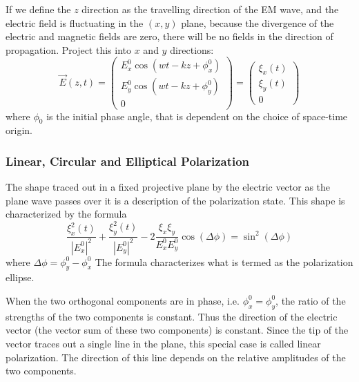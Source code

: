 If we define the $z$ direction as the travelling direction of the EM wave,
	and the electric field is fluctuating in the $(x,y)$ plane,
	because the divergence of the electric and magnetic fields are zero, 
		there will be no fields in the direction of propagation.
Project this into $x$ and $y$ directions:
\begin{equation}
\vec{E}(z,t) 
= 
\left(
	\begin{array} {c}
		E_x^0 \cos{ \left( wt - kz  + \phi_x^0 \right) } \\
		E_y^0 \cos{ \left( wt - kz  + \phi_y^0 \right)} \\
		0
	\end{array}
\right)
= 
\left(
	\begin{array} {c}
		\xi_x(t) \\
		\xi_y(t) \\
		0
	\end{array}
\right)
\end{equation}
where $\phi_0$ is the initial phase angle, that is dependent on the choice of space-time origin.

\subsubsection{Linear, Circular and Elliptical Polarization}

The shape traced out in a fixed projective plane by the electric vector as the plane wave passes over it is a description of the polarization state. 
This shape is characterized by the formula
\begin{equation}
 \frac{\xi_x^2(t)}{|E_x^0|^2} + \frac{\xi_y^2(t)}{|E_y^0|^2} - 2 \frac{\xi_x \xi_y}{E_x^0 E_y^0} \cos (\Delta \phi) = \sin^2(\Delta \phi)
\end{equation}
where
	$\Delta \phi = \phi_y^0 - \phi_x^0$
The formula characterizes what is termed as the polarization ellipse.

When the two orthogonal components are in phase, i.e. $\phi_x^0 = \phi_y^0$, the ratio of the strengths of the two components is constant.
Thus the direction of the electric vector (the vector sum of these two components) is constant. 
Since the tip of the vector traces out a single line in the plane, this special case is called linear polarization. 
The direction of this line depends on the relative amplitudes of the two components.


